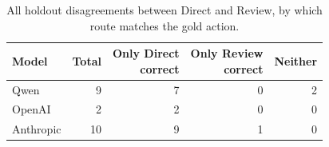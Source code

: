 \begin{table}[t]
\centering
\caption{All holdout disagreements between Direct and Review, by which route matches the gold action.}
\label{tab:disagreements}
{\small
\begin{tabular}{lrrrr}
\toprule
Model & Total & \shortstack{Only Direct\\correct} & \shortstack{Only Review\\correct} & Neither \\
\midrule
Qwen & 9 & 7 & 0 & 2 \\
OpenAI & 2 & 2 & 0 & 0 \\
Anthropic & 10 & 9 & 1 & 0 \\
\bottomrule
\end{tabular}
}
\end{table}
